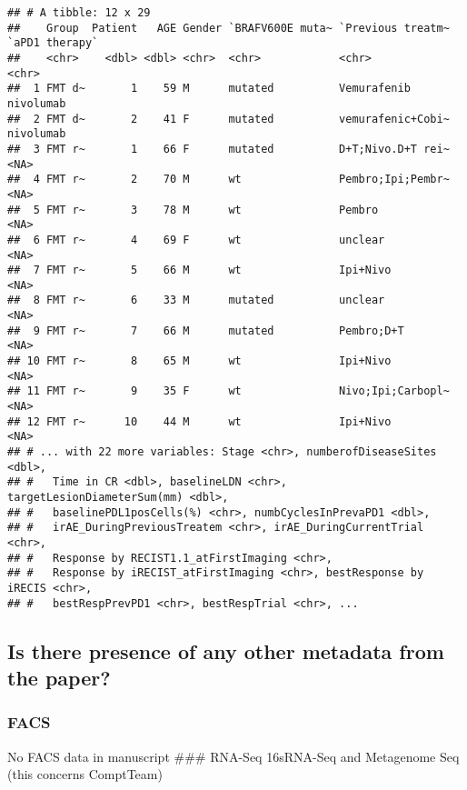 \documentclass[
]{article}
\begin{document}
\begin{verbatim}
## # A tibble: 12 x 29
##    Group  Patient   AGE Gender `BRAFV600E muta~ `Previous treatm~ `aPD1 therapy`
##    <chr>    <dbl> <dbl> <chr>  <chr>            <chr>             <chr>         
##  1 FMT d~       1    59 M      mutated          Vemurafenib       nivolumab     
##  2 FMT d~       2    41 F      mutated          vemurafenic+Cobi~ nivolumab     
##  3 FMT r~       1    66 F      mutated          D+T;Nivo.D+T rei~ <NA>          
##  4 FMT r~       2    70 M      wt               Pembro;Ipi;Pembr~ <NA>          
##  5 FMT r~       3    78 M      wt               Pembro            <NA>          
##  6 FMT r~       4    69 F      wt               unclear           <NA>          
##  7 FMT r~       5    66 M      wt               Ipi+Nivo          <NA>          
##  8 FMT r~       6    33 M      mutated          unclear           <NA>          
##  9 FMT r~       7    66 M      mutated          Pembro;D+T        <NA>          
## 10 FMT r~       8    65 M      wt               Ipi+Nivo          <NA>          
## 11 FMT r~       9    35 F      wt               Nivo;Ipi;Carbopl~ <NA>          
## 12 FMT r~      10    44 M      wt               Ipi+Nivo          <NA>          
## # ... with 22 more variables: Stage <chr>, numberofDiseaseSites <dbl>,
## #   Time in CR <dbl>, baselineLDN <chr>, targetLesionDiameterSum(mm) <dbl>,
## #   baselinePDL1posCells(%) <chr>, numbCyclesInPrevaPD1 <dbl>,
## #   irAE_DuringPreviousTreatem <chr>, irAE_DuringCurrentTrial <chr>,
## #   Response by RECIST1.1_atFirstImaging <chr>,
## #   Response by iRECIST_atFirstImaging <chr>, bestResponse by iRECIS <chr>,
## #   bestRespPrevPD1 <chr>, bestRespTrial <chr>, ...
\end{verbatim}

\hypertarget{is-there-presence-of-any-other-metadata-from-the-paper}{%
\subsection{Is there presence of any other metadata from the
paper?}\label{is-there-presence-of-any-other-metadata-from-the-paper}}

\hypertarget{facs}{%
\subsubsection{FACS}\label{facs}}

No FACS data in manuscript \#\#\# RNA-Seq 16sRNA-Seq and Metagenome Seq
(this concerns ComptTeam)
\end{document}
